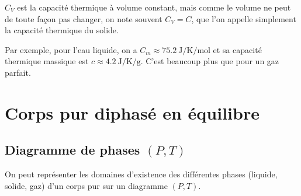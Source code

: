 \documentclass{cours}
\begin{document}
 $C_V$ est la capacité thermique à volume constant, mais comme le volume ne peut de toute façon pas changer, on note souvent $C_V=C$, que l'on appelle simplement la capacité thermique du solide.  

 Par exemple, pour l'eau liquide, on a $C_{m}\approx \SI{75.2}{\joule\per\kelvin\per\mole}$ et sa capacité thermique massique est $c\approx \SI{4.2}{\joule\per\kelvin\per\gram}$. C'est beaucoup plus que pour un gaz parfait.

\section{Corps pur diphasé en équilibre}%
\label{sec:corps_pur_diphase_en_equilibre}

\subsection{Diagramme de phases $(P,T)$ }%
\label{sub:diagramme_de_phases_p_t_}
On peut représenter les domaines d'existence des différentes phases (liquide, solide, gaz) d'un corps pur sur un diagramme $(P,T)$. 
\end{document}
